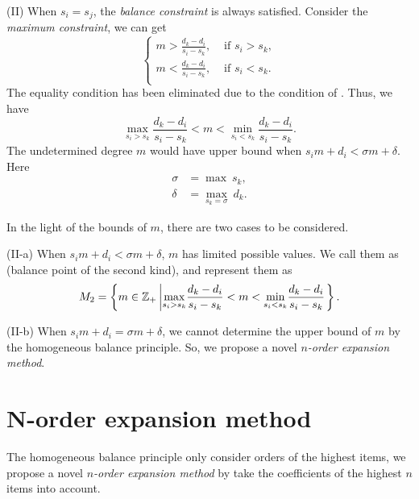 (II) When $s_i = s_j$, the \emph{balance constraint} is always satisfied. Consider the \emph{maximum constraint}, we can get
\begin{equation}
\left\{
\begin{split}
m > \frac{d_k-d_i}{s_i-s_k}, & \text{ if } s_i>s_k,  \\
m < \frac{d_k-d_i}{s_i-s_k}, & \text{ if } s_i<s_k.  \\
\end{split}
\right.
\end{equation}
The equality condition has been eliminated due to the condition of \BPone{}. Thus, we have
\begin{equation}
\underset{s_i>s_k}{\max}{\frac{d_k-d_i}{s_i-s_k}} < m < \underset{s_i<s_k}{\min}{\frac{d_k-d_i}{s_i-s_k}}.
\end{equation}
The undetermined degree $m$ would have upper bound when $s_i m + d_i < \sigma m + \delta$. Here
\begin{equation}
\begin{split}
\sigma &= \max ~s_k,  \\
\delta &= \underset{s_k=\sigma}{\max}{~d_k}.
\end{split}
\label{eq-max-sd}
\end{equation}

In the light of the bounds of $m$, there are two cases to be considered.

(II-a) When $s_i m + d_i < \sigma m + \delta$, $m$ has limited possible values. We call them as \BPtwo{} (balance point of the second kind), and represent them as
\begin{equation}
M_2=\left\{m\in \mathbb Z_+\left|\underset{s_i>s_k}{\max}{\frac{d_k-d_i}{s_i-s_k}} < m < \underset{s_i<s_k}{\min}{\frac{d_k-d_i}{s_i-s_k}}\right.\right\} .
\end{equation}

(II-b) When $s_i m + d_i = \sigma m + \delta$, we cannot determine the upper bound of $m$ by the homogeneous balance principle. So, we propose a novel \emph{$n$-order expansion method}.

\section{N-order expansion method}\label{Expansion-02}

The homogeneous balance principle only consider orders of the highest items, we propose a novel \emph{$n$-order expansion method} by take the coefficients of the highest $n$ items into account.

